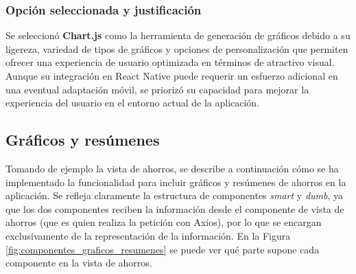 \subsubsection{Opción seleccionada y justificación}
Se seleccionó \textbf{Chart.js} como la herramienta de generación de gráficos debido a su ligereza, variedad de tipos de gráficos y opciones de personalización que permiten ofrecer una experiencia de usuario optimizada en términos de atractivo visual. Aunque su integración en React Native puede requerir un esfuerzo adicional en una eventual adaptación móvil, se priorizó su capacidad para mejorar la experiencia del usuario en el entorno actual de la aplicación\cite{chartjs2023}.



\subsection{Gráficos y resúmenes}
Tomando de ejemplo la vista de ahorros, se describe a continuación cómo se ha implementado la funcionalidad para incluir gráficos y resúmenes de ahorros en la aplicación. Se refleja claramente la estructura de componentes \textit{smart} y \textit{dumb}, ya que los dos componentes reciben la información desde el componente de vista de ahorros (que es quien realiza la petición con Axios), por lo que se encargan exclusivamente de la representación de la información\cite{khan2023reactjs}. En la Figura \ref{fig:componentes_graficos_resumenes} se puede ver qué parte supone cada componente en la vista de ahorros.

